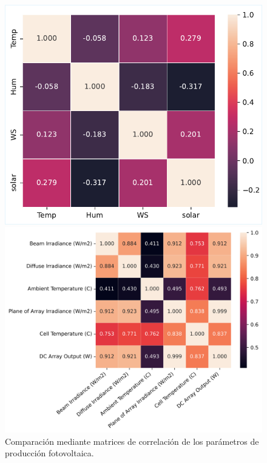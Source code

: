 \begin{figure}[ht!]
    \centering
    \begin{minipage}{0.39\textwidth}
        \centering
        \includegraphics[width=\linewidth]{fig/06_fault_sg/fault_sg_03a.pdf}
    \end{minipage}
    \hfill
    \begin{minipage}{0.54\textwidth}
        \centering
        \includegraphics[width=\linewidth]{fig/06_fault_sg/fault_sg_03b.png}
    \end{minipage}

    \caption{Comparación mediante matrices de correlación de los parámetros de producción fotovoltaica.}
    \label{fig:corrSUST_PVWATTS}
\end{figure}

